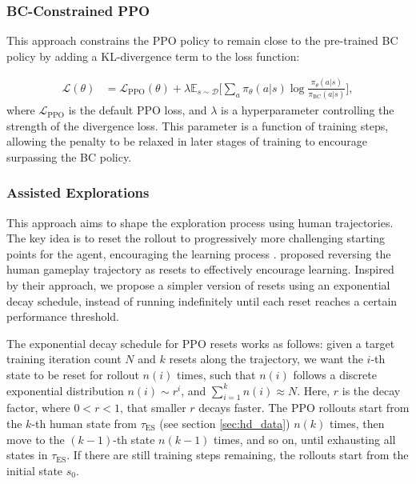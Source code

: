 \documentclass{article}
\begin{document}
\subsubsection{BC-Constrained PPO}
\label{sec:bcc}
This approach constrains the PPO policy to remain close to the pre-trained BC 
policy by adding a KL-divergence term to the loss function:

\begin{align*}
      \mathcal{L}(\theta) 
      &= \mathcal{L}_{\text{PPO}}(\theta) +
      \lambda \mathbb{E}_{s \sim \mathcal{D}} \bigg[ \sum_{a} \pi_{\theta}(a | s) \log 
      \frac{\pi_{\theta}(a | s)}{\pi_{\text{BC}}(a | s)} \bigg],
\end{align*}
where $\mathcal{L}_{\text{PPO}}$ is the default PPO loss, and $\lambda$ is a 
hyperparameter controlling the strength of the divergence loss. This parameter 
is a function of training steps, allowing the penalty to be relaxed in later 
stages of training to encourage surpassing the BC policy.

\subsubsection{Assisted Explorations}
This approach aims to shape the exploration process using human trajectories. 
The key idea is to reset the rollout to progressively more challenging starting 
points for the agent, encouraging the learning process \cite{florensa2018reversecurriculumgenerationreinforcement}. 
\cite{salimans2018learningmontezumasrevengesingle} proposed reversing the human 
gameplay trajectory as resets to effectively encourage learning. Inspired by 
their approach, we propose a simpler version of resets using an exponential 
decay schedule, instead of running indefinitely until each reset reaches a 
certain performance threshold.

The exponential decay schedule for PPO resets works as follows: given a target 
training iteration count $N$ and $k$ resets along the trajectory, we want the 
$i$-th state to be reset for rollout $n(i)$ times, such that $n(i)$ follows a 
discrete exponential distribution $n(i) \sim r^i$, and $\sum_{i=1}^{k} n(i) 
\approx N$. Here, $r$ is the decay factor, where $0 < r < 1$, that smaller $r$ decays 
faster. The PPO rollouts start from the $k$-th human state from 
$\tau_{\text{ES}}$ (see section \ref{sec:hd_data}) $n(k)$ times, then move to 
the $(k-1)$-th state $n(k-1)$ times, and so on, until exhausting all states in 
$\tau_{\text{ES}}$. If there are still training steps remaining, the rollouts 
start from the initial state $s_0$.
\end{document}

